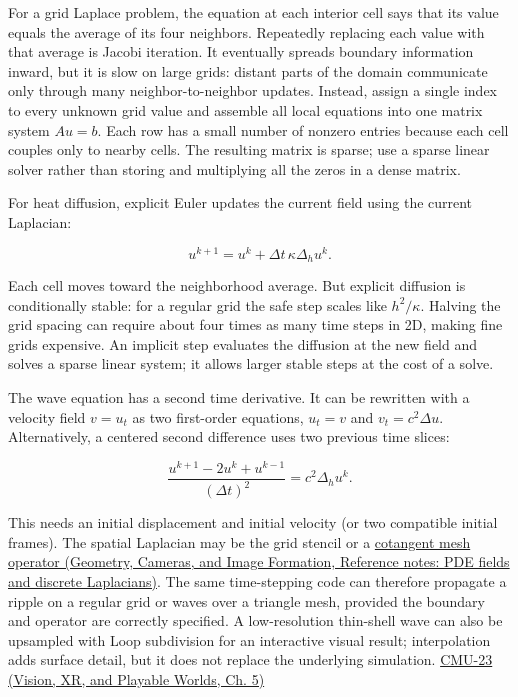 \hypertarget{04-visual-computing-ii-ch030-turn-the-discretized-equations-into-a-solver}{}

For a grid Laplace problem, the equation at each interior cell says that its value equals the average of its four neighbors. Repeatedly replacing each value with that average is Jacobi iteration. It eventually spreads boundary information inward, but it is slow on large grids: distant parts of the domain communicate only through many neighbor-to-neighbor updates. Instead, assign a single index to every unknown grid value and assemble all local equations into one matrix system \(Au=b\). Each row has a small number of nonzero entries because each cell couples only to nearby cells. The resulting matrix is sparse; use a sparse linear solver rather than storing and multiplying all the zeros in a dense matrix.

For heat diffusion, explicit Euler updates the current field using the current Laplacian:

\[
u^{k+1}=u^k+\Delta t\,\kappa\Delta_h u^k.
\]

Each cell moves toward the neighborhood average. But explicit diffusion is conditionally stable: for a regular grid the safe step scales like \(h^2/\kappa\). Halving the grid spacing can require about four times as many time steps in 2D, making fine grids expensive. An implicit step evaluates the diffusion at the new field and solves a sparse linear system; it allows larger stable steps at the cost of a solve.

The wave equation has a second time derivative. It can be rewritten with a velocity field \(v=u_t\) as two first-order equations, \(u_t=v\) and \(v_t=c^2\Delta u\). Alternatively, a centered second difference uses two previous time slices:

\[
\frac{u^{k+1}-2u^k+u^{k-1}}{(\Delta t)^2}=c^2\Delta_h u^k.
\]

This needs an initial displacement and initial velocity (or two compatible initial frames). The spatial Laplacian may be the grid stencil or a \href{../03-Geometry-Cameras-and-Image-Formation/main.pdf\#nameddest=appendix-1988d465c119}{cotangent mesh operator (Geometry, Cameras, and Image Formation, Reference notes: PDE fields and discrete Laplacians)}. The same time-stepping code can therefore propagate a ripple on a regular grid or waves over a triangle mesh, provided the boundary and operator are correctly specified. A low-resolution thin-shell wave can also be upsampled with Loop subdivision for an interactive visual result; interpolation adds surface detail, but it does not replace the underlying simulation. \href{../07-Vision-XR-and-Playable-Worlds/main.pdf\#nameddest=04-visual-computing-ii-ch036-cmu-23---physically-based-animation-and-pdes}{CMU-23 (Vision, XR, and Playable Worlds, Ch. 5)}


